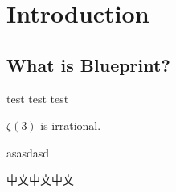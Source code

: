 %

\chapter{Introduction}

\section{What is Blueprint?}

test test test

\begin{center}
\end{center}

$\zeta(3)$ is irrational.

asasdasd

中文中文中文